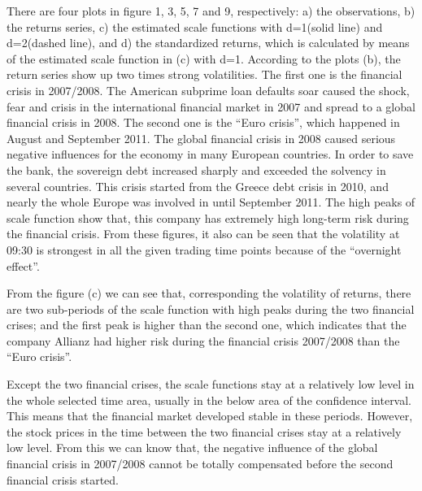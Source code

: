 There are four plots in figure 1, 3, 5, 7 and 9, respectively: a) the observations, b) the returns series, c) the estimated scale functions with d=1(solid line) and d=2(dashed line), and d) the standardized returns, which is calculated by means of the estimated scale function in (c) with d=1. 
According to the plots (b), the return series show up two times strong volatilities. The first one is the financial crisis in 2007/2008. The American subprime loan defaults soar caused the shock, fear and crisis in the international financial market in 2007 and spread to a global financial crisis in 2008. The second one is the “Euro crisis”, which happened in August and September 2011. The global financial crisis in 2008 caused serious negative influences for the economy in many European countries. In order to save the bank, the sovereign debt increased sharply and exceeded the solvency in several countries. This crisis started from the Greece debt crisis in 2010, and nearly the whole Europe was involved in until September 2011. The high peaks of scale function show that, this company has extremely high long-term risk during the financial crisis. From these figures, it also can be seen that the volatility at 09:30 is strongest in all the given trading time points because of the ``overnight effect''. 

From the figure (c) we can see that, corresponding the volatility of returns, there are two sub-periods of the scale function with high peaks during the two financial crises; and the first peak is higher than the second one, which indicates that the company Allianz had higher risk during the financial crisis 2007/2008 than the ``Euro crisis''.

Except the two financial crises, the scale functions stay at a relatively low level in the whole selected time area, usually in the below area of the confidence interval. This means that the financial market developed stable in these periods. However, the stock prices in the time between the two financial crises stay at a relatively low level. From this we can know that, the negative influence of the global financial crisis in 2007/2008 cannot be totally compensated before the second financial crisis started. 

